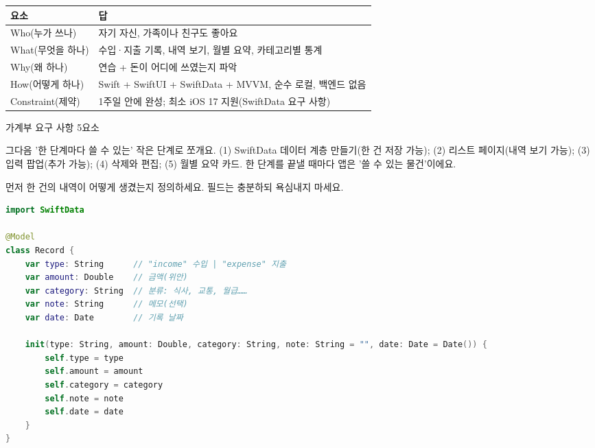


\begin{center}
\begin{tabularx}{\linewidth}{|X|X|}
\hline
\textbf{요소} & \textbf{답} \tabularnewline
\hline
Who(누가 쓰나) & 자기 자신, 가족이나 친구도 좋아요 \tabularnewline
What(무엇을 하나) & 수입·지출 기록, 내역 보기, 월별 요약, 카테고리별 통계 \tabularnewline
Why(왜 하나) & 연습 + 돈이 어디에 쓰였는지 파악 \tabularnewline
How(어떻게 하나) & Swift + SwiftUI + SwiftData + MVVM, 순수 로컬, 백엔드 없음 \tabularnewline
Constraint(제약) & 1주일 안에 완성; 최소 iOS 17 지원(SwiftData 요구 사항) \tabularnewline
\hline
\end{tabularx}
\end{center}

\begin{center}\small\color{gray}가계부 요구 사항 5요소\end{center}

그다음 '한 단계마다 쓸 수 있는' 작은 단계로 쪼개요. (1) SwiftData 데이터 계층 만들기(한 건 저장 가능); (2) 리스트 페이지(내역 보기 가능); (3) 입력 팝업(추가 가능); (4) 삭제와 편집; (5) 월별 요약 카드. 한 단계를 끝낼 때마다 앱은 '쓸 수 있는 물건'이에요.


먼저 한 건의 내역이 어떻게 생겼는지 정의하세요. 필드는 충분하되 욕심내지 마세요.

\begin{lstlisting}[language=Swift]
import SwiftData

@Model
class Record {
    var type: String      // "income" 수입 | "expense" 지출
    var amount: Double    // 금액(위안)
    var category: String  // 분류: 식사, 교통, 월급……
    var note: String      // 메모(선택)
    var date: Date        // 기록 날짜

    init(type: String, amount: Double, category: String, note: String = "", date: Date = Date()) {
        self.type = type
        self.amount = amount
        self.category = category
        self.note = note
        self.date = date
    }
}
\end{lstlisting}

